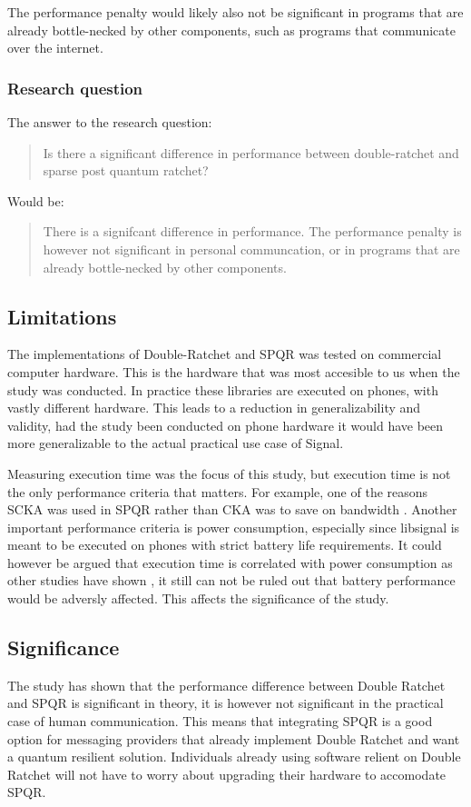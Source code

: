 The performance penalty would likely also not be significant in programs that are already bottle-necked by other components,
such as programs that communicate over the internet.

\subsubsection{Research question}
The answer to the research question:
\begin{quote}
Is there a significant difference in performance between double-ratchet and sparse post quantum ratchet?
\end{quote}
Would be:
\begin{quote}
    There is a signifcant difference in performance.
    The performance penalty is however not significant in personal communcation, or in programs that are already bottle-necked by other components.
\end{quote}


\subsection{Limitations}

The implementations of Double-Ratchet and SPQR was tested on commercial computer hardware.
This is the hardware that was most accesible to us when the study was conducted.
In practice these libraries are executed on phones, with vastly different hardware.
This leads to a reduction in generalizability and validity,
had the study been conducted on phone hardware it would have been more generalizable to the actual practical use case of Signal.


Measuring execution time was the focus of this study, but execution time is not the only performance criteria that matters.
For example, one of the reasons SCKA was used in SPQR rather than CKA was to save on bandwidth \cite{ref24}.
Another important performance criteria is power consumption, especially since libsignal is meant to be executed on phones with strict battery life requirements.
It could however be argued that execution time is correlated with power consumption as other studies have shown \cite{ref27},
it still can not be ruled out that battery performance would be adversly affected.
This affects the significance of the study.

\subsection{Significance}
The study has shown that the performance difference between Double Ratchet and SPQR is significant in theory, it is however not significant in the practical case of human communication. 
This means that integrating SPQR is a good option for messaging providers that already implement Double Ratchet and want a quantum resilient solution.
Individuals already using software relient on Double Ratchet will not have to worry about upgrading their hardware to accomodate SPQR.

